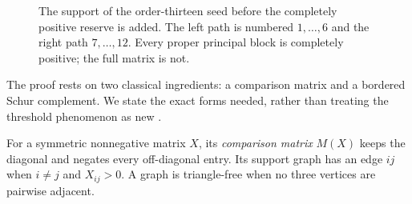 \begin{figure}[htbp]
\centering
{}
\caption{The support of the order-thirteen seed before the completely positive reserve is added. The left path is numbered $1,\ldots,6$ and the right path $7,\ldots,12$. Every proper principal block is completely positive; the full matrix is not.}
\label{fig:bouquet}
\end{figure}

The proof rests on two classical ingredients: a comparison matrix and a bordered Schur complement. We state the exact forms needed, rather than treating the threshold phenomenon as new \cite{Drew,Barioli}.

For a symmetric nonnegative matrix $X$, its \emph{comparison matrix} $M(X)$ keeps the diagonal and negates every off-diagonal entry. Its support graph has an edge $ij$ when $i\ne j$ and $X_{ij}>0$. A graph is triangle-free when no three vertices are pairwise adjacent.

